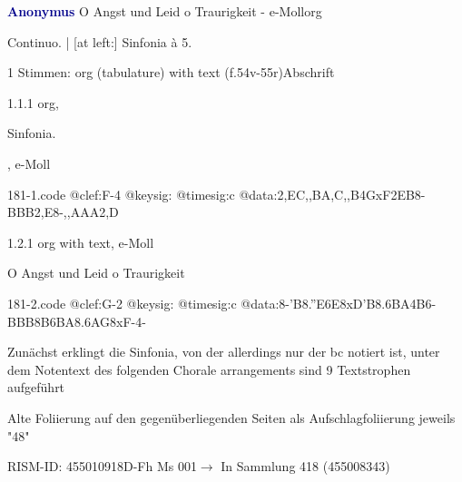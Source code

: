 \documentclass[twocolumn]{book}
\begin{document}
\par \vspace{7pt} \textcolor{darkblue}{\textbf{Anonymus  }}\hfillplus{\textbf{[181]}}\newline O Angst und Leid o Traurigkeit - e-Moll\newline org
\par \begin{itshape}[f.54v, heading:] Continuo. | [at left:] Sinfonia à 5.\end{itshape} 
\par \textcolor{darkblue}{}  1 Stimmen: org (tabulature) with text  (f.54v-55r)\newline Abschrift
\par 1.1.1  org, \begin{itshape}Sinfonia.\end{itshape}, e-Moll  
\begin{filecontents*}{181-1.code}
@clef:F-4
@keysig:
@timesig:c
@data:2,EC,,BA,C,,B4GxF2EB8-{BBB}2,E8-{,,AAA}2,D
\end{filecontents*}
\newline
%
\par 1.2.1  org with text, e-Moll\newline \begin{footnotesize} O Angst und Leid o Traurigkeit \end{footnotesize}  
\begin{filecontents*}{181-2.code}
@clef:G-2
@keysig:
@timesig:c
@data:8-{'B8.''E6E}{8xD'B8.6BA}4B6-{BBB}{8B6BA8.6AG}8xF-4-
\end{filecontents*}
\newline
%
\par Zunächst erklingt die Sinfonia, von der allerdings nur der bc notiert ist, unter dem Notentext des folgenden Chorale arrangements sind 9 Textstrophen aufgeführt
\par Alte Foliierung auf den gegenüberliegenden Seiten als Aufschlagfoliierung jeweils "48"
\par RISM-ID: 455010918\newline D-Fh  Ms 001\newline $\rightarrow$ In Sammlung 418 (455008343)
      
\end{document}
